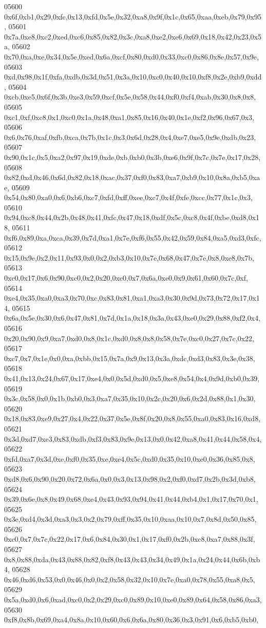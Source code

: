 \begin{DoxyCode}
05600   0x6f,0xb1,0x29,0xfc,0x13,0xfd,0x5e,0x32,0xa8,0x9f,0x1c,0x65,0xaa,0xeb,0x79,0x95,
05601   0x7a,0xe8,0xc2,0xed,0xc6,0x85,0x82,0x3c,0xa8,0xe2,0xe6,0x69,0x18,0x42,0x23,0x5a,
05602   0x70,0xa,0xe,0x34,0x5e,0xed,0x6a,0xcf,0x80,0xd0,0x33,0xc0,0x86,0x8e,0x57,0x9e,
05603   0xd,0x98,0x1f,0xfa,0xdb,0x3d,0x51,0x3a,0x10,0xc0,0x40,0x10,0xf8,0x2e,0xb9,0xdd,
05604   0xcb,0xe5,0x6f,0x3b,0xe3,0x59,0xcf,0x5e,0x58,0x44,0xf0,0xf4,0xab,0x30,0x8,0x8,
05605   0xc1,0xf,0xc8,0x1,0xc0,0x1a,0x48,0xa1,0x85,0x16,0x40,0x1e,0xf2,0x96,0x67,0x3,
05606   0x6,0x76,0xaf,0xfb,0xca,0x7b,0x1c,0x3,0x6d,0x28,0x4,0xe7,0xe5,0x9e,0xdb,0x23,
05607   0x90,0x1c,0x5,0xa2,0x97,0x19,0xde,0xb,0xb0,0x3b,0xe6,0x9f,0x7c,0x7e,0x17,0x28,
05608   0x82,0xd,0x46,0x6d,0x82,0x18,0xac,0x37,0xf0,0x83,0xa7,0xb9,0x10,0x8a,0xb5,0xae,
05609   0x54,0x80,0xa0,0x6,0xb6,0xc7,0xfd,0xff,0xee,0xc7,0x4f,0xfe,0xcc,0x77,0x1c,0x3,
05610   0x94,0xc8,0x44,0x2b,0x48,0x41,0xfc,0x47,0x18,0xdf,0x5c,0xc8,0x4f,0xbe,0xd8,0x18,
05611   0xf6,0x89,0xa,0xca,0x39,0x7d,0xa1,0x7e,0xf6,0x55,0x42,0x59,0x84,0xa5,0xd3,0xfc,
05612   0x15,0x9e,0x2,0x11,0x93,0x0,0x2,0xb3,0x10,0x7e,0x68,0x47,0x7e,0x8,0xe8,0x7b,
05613   0xc0,0x17,0x6,0x90,0xc0,0x2,0x20,0xc0,0x7,0x6a,0xe0,0x9,0x61,0x60,0x7c,0xf,
05614   0xe4,0x35,0xa0,0xa3,0x70,0xc,0x83,0x81,0xa1,0xa3,0x30,0x9d,0x73,0x72,0x17,0x14,
05615   0x6a,0x5e,0x30,0x6,0x47,0x81,0x7d,0x1a,0x18,0x3a,0x43,0xe0,0x29,0x88,0xf2,0x4,
05616   0x20,0x90,0x9,0xa7,0xd0,0x8,0x1c,0xd0,0x8,0x8,0x58,0x7e,0xc0,0x27,0x7c,0x22,
05617   0xc7,0x7,0x1e,0x0,0xa,0xbb,0x15,0x7a,0x9,0x13,0x3a,0xdc,0xd3,0x83,0x3e,0x38,
05618   0x41,0x13,0x24,0x67,0x17,0xe4,0x0,0x5d,0xd0,0x5,0xe8,0x54,0x4,0x9d,0xb0,0x39,
05619   0x3c,0x58,0x0,0x1b,0xb0,0x3,0xa7,0x35,0x10,0x2c,0x20,0x6,0x2d,0x88,0x1,0x30,
05620   0x18,0x83,0xe9,0x27,0x4,0x22,0x37,0x5e,0x8f,0x20,0x8,0x55,0xa0,0x83,0x16,0xd8,
05621   0x3d,0xd7,0xe3,0x83,0xdb,0xf3,0x83,0x9e,0x13,0x0,0x42,0xa8,0x41,0x44,0x58,0x4,
05622   0xfd,0xa7,0x3d,0xe,0xf0,0x35,0xe,0xe4,0x5c,0xd0,0x35,0x10,0xe0,0x36,0x85,0x8,
05623   0xd8,0x6,0x90,0x20,0x72,0x6a,0x0,0x3,0x13,0x98,0x2,0xf0,0xd7,0x2b,0x3d,0xb8,
05624   0x39,0x6e,0x8,0x49,0x68,0xe4,0x43,0x93,0x94,0x41,0x44,0xb4,0x1,0x17,0x70,0x1,
05625   0x3e,0xd4,0x3d,0xa3,0x3,0x2,0x79,0xff,0x35,0x10,0xaa,0x10,0x7,0x8d,0x50,0x85,
05626   0xc0,0x7,0x7c,0x22,0x17,0x6,0x84,0x30,0x1,0x17,0xf0,0x2b,0xc8,0xa7,0x88,0x3f,
05627   0x8,0x88,0xda,0x43,0x88,0x82,0xf8,0x43,0x43,0x34,0x49,0x1a,0x24,0x44,0x6b,0xb4,
05628   0x46,0xd6,0x53,0x0,0x46,0x0,0x2,0x58,0x32,0x10,0x7e,0xa0,0x78,0x55,0xa8,0x5,
05629   0x5a,0xd0,0x6,0xad,0xc0,0x2,0x29,0xc0,0x89,0x10,0xe0,0x89,0x64,0x58,0x86,0xa3,
05630   0xf8,0x8b,0x69,0xa4,0x8a,0x10,0x60,0x6,0x6a,0x80,0x36,0x3,0x91,0x6,0xb5,0xb0,

\end{DoxyCode}
